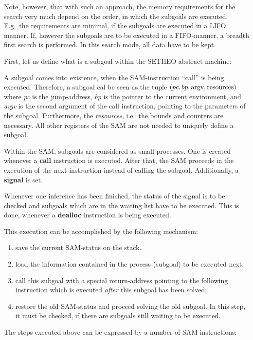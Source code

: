 Note, however, that with such an approach, the memory requirements
for the search very much depend on the order, in which the subgoals are executed.
E.g.\ the requirements are minimal, if the subgoals are executed in a LIFO manner.
If, however the subgoals are to be executed in a FIFO-manner, a breadth first
search is performed. In this search mode, all data have to be kept.

First, let us define what is a subgoal within the SETHEO abstract machine:

A subgoal comes into existence, when the SAM-instruction ``call'' is being
executed.
Therefore, a subgoal cal be seen as the tuple
$( pc,bp,{\rm argv},{\rm resources})$ where {\em pc} is the jump-address,
{\em bp\/} is the pointer to the current environment, and {\em argv\/}
is the second argument of the call instruction, pointing to the
parameters of the subgoal. Furthermore, the {\em resources\/}, i.e.\ the bounds
and counters are necessary. All other registers of the SAM are not
needed to uniquely define a subgoal.


Within the SAM, subgoals are considered as small processes. One is
created whenever a {\bf call} instruction is executed. After that, the SAM
proceeds in the execution of the next instruction instead of calling the
subgoal.
Additionally, a {\bf signal} is set.

Whenever one inference has been finished, the status of the signal is
to be checked and subgoals which are in the waiting list have to be executed.
This is done, whenever a {\bf dealloc} instruction is being executed.

This execution can be accomplished by the following mechanism:

\begin{enumerate}
\item
save the current SAM-status on the stack.
\item
load the information contained in the process (subgoal) to be executed
next.
\item
call this subgoal with a special return-address pointing to the
following instruction which is executed {\em after\/} this subgoal
has been solved:
\item
restore the old SAM-status and proceed solving the old subgoal.
In this step, it must be checked, if there are subgoals still waiting to
be executed.
\end{enumerate}

The steps executed above can be expressed by a number of SAM-instructions:

